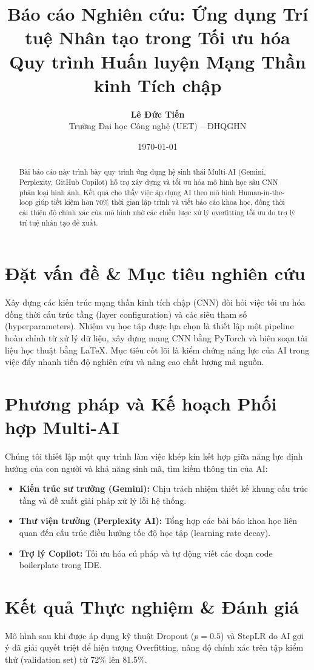 \documentclass[11pt,a4paper]{article}
\title{\textbf{Báo cáo Nghiên cứu: Ứng dụng Trí tuệ Nhân tạo trong Tối ưu hóa Quy trình Huấn luyện Mạng Thần kinh Tích chập}}
\author{\textbf{Lê Đức Tiến} \\ Trường Đại học Công nghệ (UET) -- ĐHQGHN}
\date{\today}
\begin{document}
\maketitle

\begin{abstract}
Bài báo cáo này trình bày quy trình ứng dụng hệ sinh thái Multi-AI (Gemini, Perplexity, GitHub Copilot) hỗ trợ xây dựng và tối ưu hóa mô hình học sâu CNN phân loại hình ảnh. Kết quả cho thấy việc áp dụng AI theo mô hình Human-in-the-loop giúp tiết kiệm hơn 70\% thời gian lập trình và viết báo cáo khoa học, đồng thời cải thiện độ chính xác của mô hình nhờ các chiến lược xử lý overfitting tối ưu do trợ lý trí tuệ nhân tạo đề xuất.
\end{abstract}

\section{Đặt vấn đề \& Mục tiêu nghiên cứu}
Xây dựng các kiến trúc mạng thần kinh tích chập (CNN) đòi hỏi việc tối ưu hóa đồng thời cấu trúc tầng (layer configuration) và các siêu tham số (hyperparameters). Nhiệm vụ học tập được lựa chọn là thiết lập một pipeline hoàn chỉnh từ xử lý dữ liệu, xây dựng mạng CNN bằng PyTorch và biên soạn tài liệu học thuật bằng \LaTeX{}. Mục tiêu cốt lõi là kiểm chứng năng lực của AI trong việc đẩy nhanh tiến độ nghiên cứu và nâng cao chất lượng mã nguồn.

\section{Phương pháp và Kế hoạch Phối hợp Multi-AI}
Chúng tôi thiết lập một quy trình làm việc khép kín kết hợp giữa năng lực định hướng của con người và khả năng sinh mã, tìm kiếm thông tin của AI:
\begin{itemize}
    \item \textbf{Kiến trúc sư trưởng (Gemini):} Chịu trách nhiệm thiết kế khung cấu trúc tầng và đề xuất giải pháp xử lý lỗi hệ thống.
    \item \textbf{Thư viện trưởng (Perplexity AI):} Tổng hợp các bài báo khoa học liên quan đến cấu trúc điều hướng tốc độ học tập (learning rate decay).
    \item \textbf{Trợ lý Copilot:} Tối ưu hóa cú pháp và tự động viết các đoạn code boilerplate trong IDE.
\end{itemize}

\section{Kết quả Thực nghiệm \& Đánh giá}
Mô hình sau khi được áp dụng kỹ thuật Dropout ($p=0.5$) và StepLR do AI gợi ý đã giải quyết triệt để hiện tượng Overfitting, nâng độ chính xác trên tập kiểm thử (validation set) từ 72\% lên 81.5\%.
\end{document}
